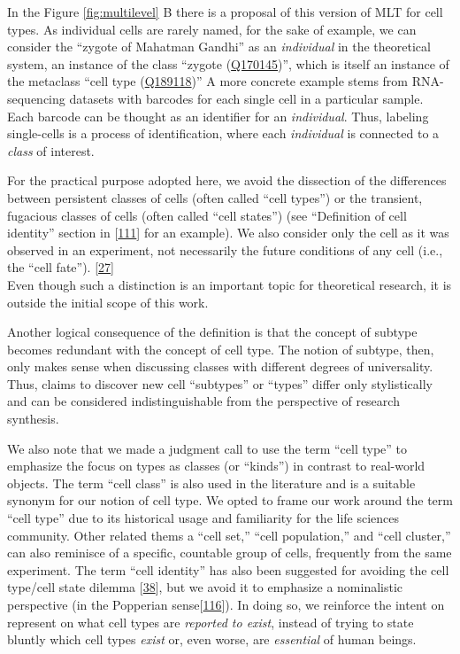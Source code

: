 In the Figure \ref{fig:multilevel} B there is a proposal of this version of MLT for cell types.
As individual cells are rarely named, for the sake of example, we can consider the ``zygote of Mahatman Gandhi'' as an \emph{individual} in the theoretical system, an instance of the class ``zygote (\href{https://www.wikidata.org/wiki/Q170145}{Q170145})'', which is itself an instance of the metaclass ``cell type (\href{https://www.wikidata.org/wiki/Q189118}{Q189118})''
A more concrete example stems from RNA-sequencing datasets with barcodes for each single cell in a particular sample.
Each barcode can be thought as an identifier for an \emph{individual}.
Thus, labeling single-cells is a process of identification, where each \emph{individual} is connected to a \emph{class} of interest.

For the practical purpose adopted here, we avoid the dissection of the differences between persistent classes of cells (often called ``cell types'') or the transient, fugacious classes of cells (often called ``cell states'') (see ``Definition of cell identity'' section in {[}\protect\hyperlink{ref-pFijpXkl}{111}{]} for an example). We also consider only the cell as it was observed in an experiment, not necessarily the future conditions of any cell (i.e., the ``cell fate''). {[}\protect\hyperlink{ref-OjxQDZpx}{27}{]}\\
Even though such a distinction is an important topic for theoretical research, it is outside the initial scope of this work.

Another logical consequence of the definition is that the concept of subtype becomes redundant with the concept of cell type.
The notion of subtype, then, only makes sense when discussing classes with different degrees of universality.
Thus, claims to discover new cell ``subtypes'' or ``types'' differ only stylistically and can be considered indistinguishable from the perspective of research synthesis.

We also note that we made a judgment call to use the term ``cell type'' to emphasize the focus on types as classes (or ``kinds'') in contrast to real-world objects.
The term ``cell class'' is also used in the literature and is a suitable synonym for our notion of cell type.
We opted to frame our work around the term ``cell type'' due to its historical usage and familiarity for the life sciences community.
Other related thems a ``cell set,'' ``cell population,'' and ``cell cluster,'' can also reminisce of a specific, countable group of cells, frequently from the same experiment.
The term ``cell identity'' has also been suggested for avoiding the cell type/cell state dilemma {[}\protect\hyperlink{ref-WKbly37M}{38}{]}, but we avoid it to emphasize a nominalistic perspective (in the Popperian sense{[}\protect\hyperlink{ref-1C6LI68h6}{116}{]}).
In doing so, we reinforce the intent on represent on what cell types are \emph{reported to exist}, instead of trying to state bluntly which cell types \emph{exist} or, even worse, are \emph{essential} of human beings.

